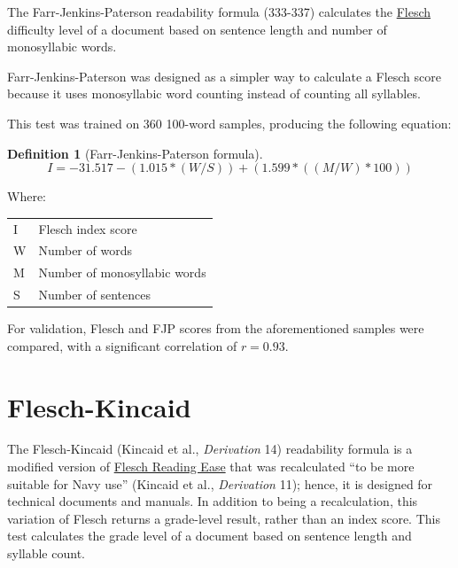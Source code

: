 \documentclass[
]{book}
\theoremstyle{definition}
\newtheorem{definition}{Definition}[chapter]
\theoremstyle{definition}
\theoremstyle{definition}
\theoremstyle{definition}
\theoremstyle{remark}
\begin{document}
The Farr-Jenkins-Paterson readability formula (333-337) calculates the \protect\hyperlink{flesch-test}{Flesch} difficulty level of a document based on sentence length and number of monosyllabic words.

Farr-Jenkins-Paterson was designed as a simpler way to calculate a Flesch score because it uses monosyllabic word counting instead of counting all syllables.

This test was trained on 360 100-word samples, producing the following equation:

\begin{definition}[Farr-Jenkins-Paterson formula]
\protect\hypertarget{def:fjp}{}{\label{def:fjp} {} }\[
I = -31.517 - (1.015*(W/S)) + (1.599*((M/W)*100))
\]
\end{definition}

Where:

\begin{longtable}[]{@{}
  >{\raggedright\arraybackslash}p{}
  >{\raggedright\arraybackslash}p{}@{}}
\toprule
\endhead
I & Flesch index score \\
W & Number of words \\
M & Number of monosyllabic words \\
S & Number of sentences \\
\bottomrule
\end{longtable}

For validation, Flesch and FJP scores from the aforementioned samples were compared, with a significant correlation of \(r = 0.93\).

\newpage

\hypertarget{flesch-kincaid-test}{%
\section{\texorpdfstring{Flesch-Kincaid}{Flesch-Kincaid}}\label{flesch-kincaid-test}}

The Flesch-Kincaid (Kincaid et al., \emph{Derivation} 14) readability formula is a modified version of \protect\hyperlink{flesch-test}{Flesch Reading Ease} that was recalculated ``to be more suitable for Navy use'' (Kincaid et al., \emph{Derivation} 11); hence, it is designed for technical documents and manuals. In addition to being a recalculation, this variation of Flesch returns a grade-level result, rather than an index score. This test calculates the grade level of a document based on sentence length and syllable count.
\end{document}
